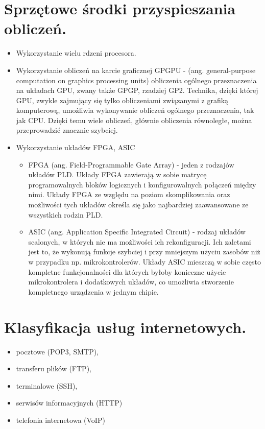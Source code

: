 \documentclass[12pt,a4paper]{article}
\begin{document}
	\section{Sprzętowe środki przyspieszania obliczeń.}
	\begin{itemize}
		\item Wykorzystanie wielu rdzeni procesora.
		\item Wykorzystanie obliczeń na karcie graficznej GPGPU - (ang. general-purpose computation on graphics processing units) obliczenia ogólnego przeznaczenia na układach GPU, zwany także GPGP, rzadziej GP2. Technika, dzięki której GPU, zwykle zajmujący się tylko obliczeniami związanymi z grafiką komputerową, umożliwia wykonywanie obliczeń ogólnego przeznaczenia, tak jak CPU. Dzięki temu wiele obliczeń, głównie obliczenia równoległe, można przeprowadzić znacznie szybciej.
		\item Wykorzystanie układów FPGA, ASIC
		\begin{itemize}
			\item FPGA (ang. Field-Programmable Gate Array) - jeden z rodzajów układów PLD. Układy FPGA zawierają w sobie matrycę programowalnych bloków logicznych i konfigurowalnych połączeń między nimi. Układy FPGA ze względu na poziom skomplikowania oraz możliwości tych układów określa się jako najbardziej zaawansowane ze wszystkich rodzin PLD.
			\item ASIC (ang. Application Specific Integrated Circuit) - rodzaj układów scalonych, w których nie ma możliwości ich rekonfiguracji. Ich zaletami jest to, że wykonują funkcje szybciej i przy mniejszym użyciu zasobów niż w przypadku np. mikrokontrolerów. Układy ASIC mieszczą w sobie często kompletne funkcjonalności dla których byłoby konieczne użycie mikrokontrolera i dodatkowych układów, co umożliwia stworzenie kompletnego urządzenia w jednym chipie.
		\end{itemize}
	\end{itemize}

	\section{Klasyfikacja usług internetowych.}
	\begin{itemize}
		\item pocztowe (POP3, SMTP),
		\item transferu plików (FTP),
		\item terminalowe (SSH),
		\item serwisów informacyjnych (HTTP)
		\item telefonia internetowa (VoIP)
	\end{itemize}
\end{document}
